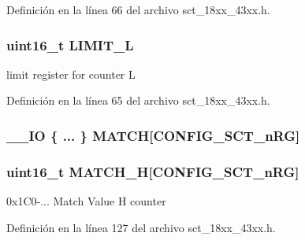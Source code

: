 Definición en la línea 66 del archivo sct\+\_\+18xx\+\_\+43xx.\+h.

\subsubsection[{\texorpdfstring{L\+I\+M\+I\+T\+\_\+L}{LIMIT_L}}]{ uint16\+\_\+t L\+I\+M\+I\+T\+\_\+L}\hypertarget{struct_l_p_c___s_c_t___t_a386846eb61f6dc3573175922c38d710e}{}\label{struct_l_p_c___s_c_t___t_a386846eb61f6dc3573175922c38d710e}
limit register for counter L 

Definición en la línea 65 del archivo sct\+\_\+18xx\+\_\+43xx.\+h.

\subsubsection[{\texorpdfstring{M\+A\+T\+CH}{MATCH}}]{\setlength{\rightskip}{0pt plus 5cm}\+\_\+\+\_\+\+IO \{ ... \}   M\+A\+T\+CH\mbox{[}{\bf C\+O\+N\+F\+I\+G\+\_\+\+S\+C\+T\+\_\+n\+RG}\mbox{]}}\hypertarget{struct_l_p_c___s_c_t___t_a0614558ab1766ffce8611f74f095e79b}{}\label{struct_l_p_c___s_c_t___t_a0614558ab1766ffce8611f74f095e79b}
\subsubsection[{\texorpdfstring{M\+A\+T\+C\+H\+\_\+H}{MATCH_H}}]{ uint16\+\_\+t M\+A\+T\+C\+H\+\_\+H\mbox{[}{\bf C\+O\+N\+F\+I\+G\+\_\+\+S\+C\+T\+\_\+n\+RG}\mbox{]}}\hypertarget{struct_l_p_c___s_c_t___t_a5ad66fb76d1eb1fec0ed8d9af8e9120d}{}\label{struct_l_p_c___s_c_t___t_a5ad66fb76d1eb1fec0ed8d9af8e9120d}
0x1\+C0-\/... Match Value H counter 

Definición en la línea 127 del archivo sct\+\_\+18xx\+\_\+43xx.\+h.


